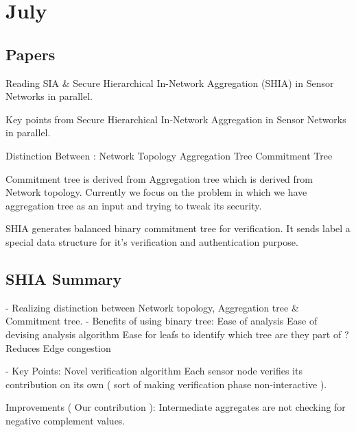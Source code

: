 \chapter{July}

	\section{Papers}

	Reading SIA & Secure Hierarchical In-Network Aggregation (SHIA) in Sensor Networks in parallel.

	Key points from Secure Hierarchical In-Network Aggregation in Sensor Networks in parallel.

		Distinction Between :
			Network Topology
			Aggregation Tree
			Commitment Tree 

			Commitment tree is derived from Aggregation tree which is derived from Network topology. Currently we focus on the problem in which we have aggregation tree as an input and trying to tweak its security. 

		SHIA generates balanced binary commitment tree for verification.
		It sends label a special data structure for it's verification and authentication purpose.


\section{SHIA Summary}

- Realizing distinction between Network topology, Aggregation tree & Commitment tree.
- Benefits of using binary tree:
	Ease of analysis
	Ease of devising analysis algorithm
	Ease for leafs to identify which tree are they part of ? 
	Reduces Edge congestion

- Key Points:
	Novel verification algorithm 
		Each sensor node verifies its contribution on its own ( sort of making  
		 verification phase non-interactive ).

	Improvements ( Our contribution ):
		Intermediate aggregates are not checking for negative complement values.	

